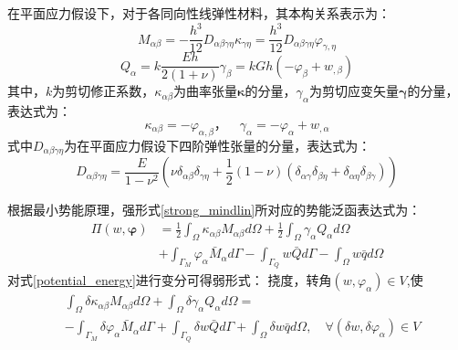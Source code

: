 在平面应力假设下，对于各同向性线弹性材料，其本构关系表示为：
\begin{equation}\label{mindlin_M}
    M_{\alpha \beta}=-\frac{h^3}{12}D_{\alpha \beta \gamma\eta}\kappa_{\gamma\eta}=\frac{h^3}{12}D_{\alpha \beta \gamma\eta}\varphi_{\gamma,\eta}
\end{equation}
\begin{equation}\label{mindlin_Q}
    Q_{\alpha}=k\frac{Eh}{2(1+\nu)}\gamma_\beta=kGh(-\varphi_\beta+w_{,\beta})
\end{equation}
其中，$k$为剪切修正系数，$\kappa_{\alpha\beta}$为曲率张量$\pmb\kappa$的分量，$\gamma_\alpha$为剪切应变矢量$\pmb\gamma$的分量，表达式为：
\begin{equation} \label{kappa}
    \kappa_{\alpha\beta}=-\varphi_{\alpha,\beta}，\quad\gamma_\alpha=-\varphi_\alpha+w_{,\alpha}
\end{equation}
式中$D_{\alpha \beta \gamma\eta}$为在平面应力假设下四阶弹性张量的分量，表达式为：
\begin{equation} 
    D_{\alpha \beta \gamma\eta}=\frac{E}{1-\nu^2}(\nu\delta_{\alpha\beta}\delta_{\gamma\eta}+\frac{1}{2}(1-\nu)(\delta_{\alpha\gamma}\delta_{\beta\eta}+\delta_{\alpha\eta}\delta_{\beta\gamma}))
\end{equation}

根据最小势能原理，强形式\eqref{strong_mindlin}所对应的势能泛函表达式为： 
\begin{equation}\label{potential_energy}
    \begin{split} 
        \Pi(w,\boldsymbol{\varphi})&=\frac{1}{2}\int_{\Omega}\kappa_{\alpha\beta}M_{\alpha\beta}d\Omega+\frac{1}{2}\int_{\Omega}\gamma_{\alpha}Q_{\alpha}d\Omega\\
        &+\int_{\Gamma_{M}}\varphi_{\alpha}{\bar{M}_{\alpha}}d\Gamma-\int_{\Gamma_{Q}}{w}\bar {Q}d\Gamma-\int_{\Omega} w\bar{q}d\Omega
    \end{split}
\end{equation}
对式\eqref{potential_energy}进行变分可得弱形式：
挠度，转角$(w,\varphi_{\alpha})\in V$,使
\begin{equation}\label{weak_penalty_mindlin}
    \begin{split} 
        &\int_{\Omega}\delta\kappa_{\alpha\beta}M_{\alpha\beta}d\Omega+\int_{\Omega}\delta\gamma_{\alpha}Q_{\alpha}d\Omega=\\
        &-\int_{\Gamma_{M}}\delta\varphi_{\alpha}{\bar{M}_{\alpha}}d\Gamma+\int_{\Gamma_{Q}}{\delta{w}}\bar {Q}d\Gamma+\int_{\Omega} \delta{w}\bar{q}d\Omega,\quad \forall(\delta w,\delta\varphi_{\alpha}) \in V
    \end{split}
\end{equation}

